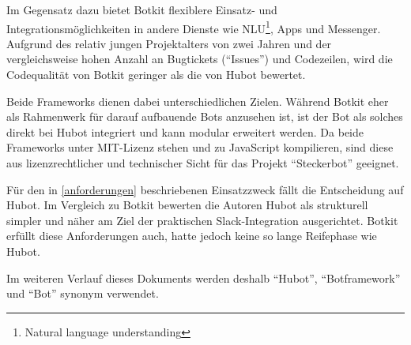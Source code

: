 Im Gegensatz dazu bietet Botkit flexiblere Einsatz- und Integrationsmöglichkeiten in andere Dienste wie NLU\footnote{Natural language understanding}, Apps und Messenger. Aufgrund des relativ jungen Projektalters von zwei Jahren und der vergleichsweise hohen Anzahl an Bugtickets (\enquote{Issues}) und Codezeilen, wird die Codequalität von Botkit geringer als die von Hubot bewertet.

Beide Frameworks dienen dabei unterschiedlichen Zielen. Während Botkit eher als Rahmenwerk für darauf aufbauende Bots anzusehen ist, ist der Bot als solches direkt bei Hubot integriert und kann modular erweitert werden. Da beide Frameworks unter MIT-Lizenz stehen und zu JavaScript kompilieren, sind diese aus lizenzrechtlicher und technischer Sicht für das Projekt \enquote{Steckerbot} geeignet.

Für den in \autoref{anforderungen} beschriebenen Einsatzzweck fällt die Entscheidung auf Hubot. Im Vergleich zu Botkit bewerten die Autoren Hubot als strukturell simpler und näher am Ziel der praktischen Slack-Integration ausgerichtet. Botkit erfüllt diese Anforderungen auch, hatte jedoch keine so lange Reifephase wie Hubot.

Im weiteren Verlauf dieses Dokuments werden deshalb \enquote{Hubot}, \enquote{Botframework} und \enquote{Bot} synonym verwendet.

